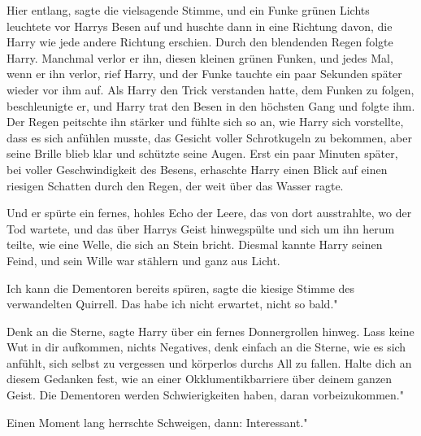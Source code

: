 \glqq{}Hier entlang\grqq{}, sagte die vielsagende Stimme, und ein Funke grünen
Lichts leuchtete vor Harrys Besen auf und huschte dann in eine Richtung davon,
die Harry wie jede andere Richtung erschien. Durch den blendenden Regen folgte
Harry. Manchmal verlor er ihn, diesen kleinen grünen Funken, und jedes Mal, wenn
er ihn verlor, rief Harry, und der Funke tauchte ein paar Sekunden später wieder
vor ihm auf. Als Harry den Trick verstanden hatte, dem Funken zu folgen,
beschleunigte er, und Harry trat den Besen in den höchsten Gang und folgte ihm.
Der Regen peitschte ihn stärker und fühlte sich so an, wie Harry sich
vorstellte, dass es sich anfühlen musste, das Gesicht voller Schrotkugeln zu
bekommen, aber seine Brille blieb klar und schützte seine Augen. Erst ein paar
Minuten später, bei voller Geschwindigkeit des Besens, erhaschte Harry einen
Blick auf einen riesigen Schatten durch den Regen, der weit über das Wasser
ragte.

Und er spürte ein fernes, hohles Echo der Leere, das von dort ausstrahlte, wo
der Tod wartete, und das über Harrys Geist hinwegspülte und sich um ihn herum
teilte, wie eine Welle, die sich an Stein bricht. Diesmal kannte Harry seinen
Feind, und sein Wille war stählern und ganz aus Licht.

\glqq{}Ich kann die Dementoren bereits spüren\grqq{}, sagte die kiesige Stimme
des verwandelten Quirrell. \glqq{}Das habe ich nicht erwartet, nicht so bald."

\glqq{}Denk an die Sterne\grqq{}, sagte Harry über ein fernes Donnergrollen
hinweg. \glqq{}Lass keine Wut in dir aufkommen, nichts Negatives, denk einfach an
die Sterne, wie es sich anfühlt, sich selbst zu vergessen und körperlos durchs
All zu fallen. Halte dich an diesem Gedanken fest, wie an einer
Okklumentikbarriere über deinem ganzen Geist. Die Dementoren werden
Schwierigkeiten haben, daran vorbeizukommen."

Einen Moment lang herrschte Schweigen, dann: \glqq{}Interessant."

